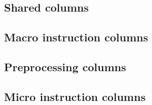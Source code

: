 \subsection{Shared columns}                      \label{mmu_v2: columns: shared}              
\subsection{Macro instruction columns}           \label{mmu_v2: columns: macro}               
\subsection{Preprocessing columns}               \label{mmu_v2: columns: preprocessing}       
\subsection{Micro instruction columns}           \label{mmu_v2: columns: micro}               

